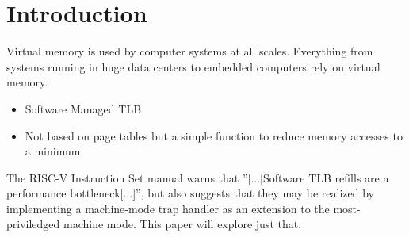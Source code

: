 \chapter{Introduction} %

\label{Intro}

Virtual memory is used by computer systems at all scales. Everything from systems running in huge data
centers to embedded computers rely on virtual memory.





\begin{itemize}
    \item Software Managed TLB
    \item Not based on page tables but a simple function to reduce memory accesses to a minimum
\end{itemize}


The RISC-V Instruction Set manual warns that ''[...]Software TLB refills are a performance bottleneck[...]''\cite{RISCVInstructionSet},
but also suggests that they may be realized by implementing a machine-mode trap handler as an extension to the
most-priviledged machine mode. This paper will explore just that.
\cite{jacob1998look}






